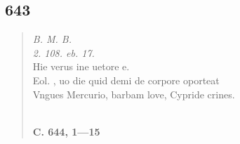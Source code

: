 \documentclass[11pt, a4paper]{report}
\begin{document}
            \subsection*{643}
      \begin{verse}
      \textit{B. M. B.} \\ \textit{2. 108. eb. 17.} \\ Hie verus ine uetore e. \\ Eol. , uo die quid demi de corpore oporteat \\ Vngues Mercurio, barbam love, Cypride crines. \\ 
        ﻿\pagebreak 
     \marginpar{[110]} \begin{center} \textbf{C. 644, 1—15} \end{center}
      \end{verse}
  
\end{document}
